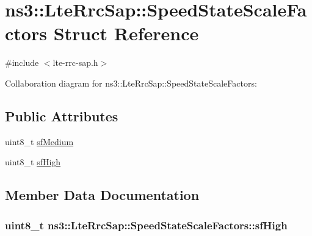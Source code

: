 \hypertarget{structns3_1_1LteRrcSap_1_1SpeedStateScaleFactors}{}\section{ns3\+:\+:Lte\+Rrc\+Sap\+:\+:Speed\+State\+Scale\+Factors Struct Reference}
\label{structns3_1_1LteRrcSap_1_1SpeedStateScaleFactors}


{\ttfamily \#include $<$lte-\/rrc-\/sap.\+h$>$}



Collaboration diagram for ns3\+:\+:Lte\+Rrc\+Sap\+:\+:Speed\+State\+Scale\+Factors\+:
\subsection*{Public Attributes}
\begin{DoxyCompactItemize}
\item 
uint8\+\_\+t \hyperlink{structns3_1_1LteRrcSap_1_1SpeedStateScaleFactors_a9445d6c4330b55f68493b270cfd4d502}{sf\+Medium}
\item 
uint8\+\_\+t \hyperlink{structns3_1_1LteRrcSap_1_1SpeedStateScaleFactors_a7e6c0a37f3457171fb41024109c5e271}{sf\+High}
\end{DoxyCompactItemize}


\subsection{Member Data Documentation}
\subsubsection[{\texorpdfstring{sf\+High}{sfHigh}}]{\setlength{\rightskip}{0pt plus 5cm}uint8\+\_\+t ns3\+::\+Lte\+Rrc\+Sap\+::\+Speed\+State\+Scale\+Factors\+::sf\+High}\hypertarget{structns3_1_1LteRrcSap_1_1SpeedStateScaleFactors_a7e6c0a37f3457171fb41024109c5e271}{}\label{structns3_1_1LteRrcSap_1_1SpeedStateScaleFactors_a7e6c0a37f3457171fb41024109c5e271}

